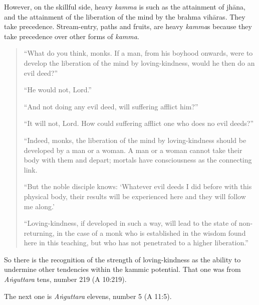 However, on the skillful side, heavy \emph{kamma} is such as the
attainment of jhāna, and the attainment of the liberation of the mind by
the brahma vihāras. They take precedence. Stream-entry, paths and
fruits, are heavy \emph{kamma}s because they take precedence over other
forms of \emph{kamma}.

\begin{quotation}
“What do you think, monks. If a man, from his boyhood onwards, were to
develop the liberation of the mind by loving-kindness, would he then do
an evil deed?”

“He would not, Lord.”

“And not doing any evil deed, will suffering afflict him?”

“It will not, Lord. How could suffering afflict one who does no evil
deeds?”

“Indeed, monks, the liberation of the mind by loving-kindness should be
developed by a man or a woman. A man or a woman cannot take their body
with them and depart; mortals have consciousness as the connecting link.

“But the noble disciple knows: ‘Whatever evil deeds I did before with
this physical body, their results will be experienced here and they will
follow me along.’

“Loving-kindness, if developed in such a way, will lead to the state of
non-returning, in the case of a monk who is established in the wisdom
found here in this teaching, but who has not penetrated to a higher
liberation.”
\end{quotation}

So there is the recognition of the strength of loving-kindness as the
ability to undermine other tendencies within the kammic potential. That
one was from \emph{Aṅguttara} tens, number 219 (A 10:219).

The next one is \emph{Aṅguttara} elevens, number 5 (A 11:5).

